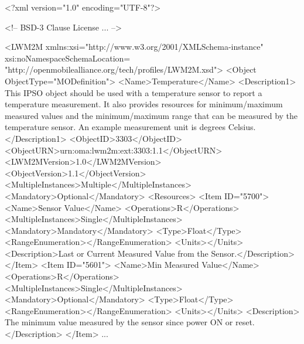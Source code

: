 \begin{termc}[backgroundcolor=\color{blue!10}, basicstyle=\ttfamily\tiny, escapechar=@, language=xml] %
<?xml version="1.0" encoding="UTF-8"?>

<!-- BSD-3 Clause License ... -->

<LWM2M  xmlns:xsi="http://www.w3.org/2001/XMLSchema-instance" xsi:noNamespaceSchemaLocation=
"http://openmobilealliance.org/tech/profiles/LWM2M.xsd">
	<Object ObjectType="MODefinition">
		<Name>Temperature</Name>
		<Description1>
		    This IPSO object should be used with a temperature sensor to report a temperature
		    measurement.  It also provides resources for minimum/maximum measured values and the
		    minimum/maximum range that can be measured 
		    by the temperature sensor. An example measurement unit is degrees Celsius.
		</Description1>
		<ObjectID>3303</ObjectID>
		<ObjectURN>urn:oma:lwm2m:ext:3303:1.1</ObjectURN>
		<LWM2MVersion>1.0</LWM2MVersion>
		<ObjectVersion>1.1</ObjectVersion>
		<MultipleInstances>Multiple</MultipleInstances>
		<Mandatory>Optional</Mandatory>
		<Resources>
			<Item ID="5700">
				<Name>Sensor Value</Name>
				<Operations>R</Operations>
				<MultipleInstances>Single</MultipleInstances>
				<Mandatory>Mandatory</Mandatory>
				<Type>Float</Type>
				<RangeEnumeration></RangeEnumeration>
				<Units></Units>
				<Description>Last or Current Measured Value from the Sensor.</Description>
			</Item>
			<Item ID="5601">
				<Name>Min Measured Value</Name>
				<Operations>R</Operations>
				<MultipleInstances>Single</MultipleInstances>
				<Mandatory>Optional</Mandatory>
				<Type>Float</Type>
				<RangeEnumeration></RangeEnumeration>
				<Units></Units>
				<Description>
				  The minimum value measured by the sensor since power ON or reset.
				  </Description>
			</Item>
			...
\end{termc}

